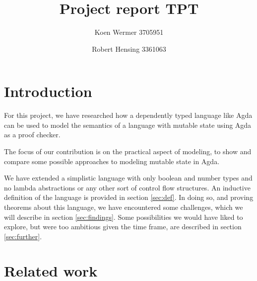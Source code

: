 \documentclass{article}
\author{Koen Wermer 3705951 \and Robert Hensing 3361063}
\title{Project report TPT}
\newcommand{\sectionref}[1]{section \ref{sec:#1}}
\begin{document}
\maketitle

\tableofcontents

%

\section{Introduction}

For this project, we have researched how a dependently typed language
like Agda can be used to model the semantics of a language with
mutable state using Agda as a proof checker.

The focus of our contribution is on the practical aspect of modeling,
to show and compare some possible approaches to modeling mutable state
in Agda.

We have extended a simplistic language with only boolean and number
types and no lambda abstractions or any other sort of control flow
structures.
An inductive definition of the language is provided in
\sectionref{def}.
In doing so, and proving theorems about this language, we have
encountered some challenges, which we will describe in
\sectionref{findings}.
Some possibilities we would have liked to explore, but were too
ambitious given the time frame, are described in \sectionref{further}.

\section{Related work}
\end{document}
